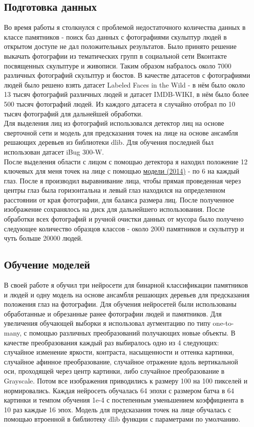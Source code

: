 \documentclass[a4paper,14pt]{extarticle}
\newcommand{\bibref}[3]{\hyperlink{#1}{#2 (#3)}} %
\begin{document}
    \subsection{Подготовка данных}
    Во время работы я столкнулся с проблемой недостаточного количества данных в классе памятников - поиск баз данных с фотографиями скульптур людей в открытом доступе не дал положительных результатов. Было принято решение выкачать фотографии из тематических групп в социальной сети Вконтакте посвященных скульптуре и живописи. Таким образом набралось около 7000 различных фотографий скульптур и бюстов. В качестве датасетов с фотографиями людей было решено взять датасет Labeled Faces in the Wild - в нём было около 13 тысяч фотографий различных людей и датасет IMDB-WIKI, в нём было более 500 тысяч фотографий людей. Из каждого датасета я случайно отобрал по 10 тысяч фотографий для дальнейшей обработки. \\
    Для выделения лиц из фотографий использовался детектор лиц на основе сверточной сети и модель для предсказания точек на лице на основе ансамбля решающих деревьев из библиотеки dlib. Для обучения последней был использован датасет iBug 300-W. \\
    После выделения области с лицом с помощью детектора я находил положение 12 ключевых для меня точек на лице с помощью \bibref{align}{модели}{2014} - по 6 на каждый глаз. После я производил выравнивание лица, чтобы прямая проведенная через центры глаз была горизонтальна и левый глаз находился на определенном расстоянии от края фотографии, для баланса размера лиц. После полученное изображение сохранялось на диск для дальнейшего использования. После обработки всех фотографий и ручной очистки данных от мусора было получено следующее количество образцов классов - около 2000 памятников и скульптур и чуть больше 20000 людей.

    \subsection{Обучение моделей}
    В своей работе я обучил три нейросети для бинарной классификации памятников и людей и одну модель на основе ансамбля решающих деревьев для предсказания положения глаз на фотографии.
    Для обучения нейросетей были использованы обработанные и обрезанные ранее фотографии людей и памятников. Для увеличения обучающей выборки я использовал аугментацию по типу one-to-many, с помощью различных преобразований получающих новые объекты. В качестве преобразования каждый раз выбиралось одно из 4 следующих: случайное изменение яркости, контраста, насыщенности и оттенка картинки, случайное афинное преобразование, случайное отражение вдоль вертикальной оси, проходящей через центр картинки, либо случайное преобразование в Grayscale. Потом все изображения приводились к размеру 100 на 100 пикселей и нормировались.
    Каждая нейросеть обучалась 64 эпохи с размером батча в 64 картинки и темпом обучения 1e-4 с постепенным уменьшением коэффициента в 10 раз каждые 16 эпох.
    Модель для предсказания точек на лице обучалась с помощью втроенной в библиотеку dlib функции с параметрами по умолчанию.
\end{document}
